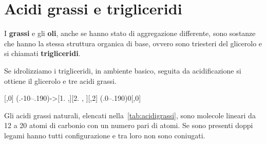 \section{Acidi grassi e trigliceridi}\label{sec:trigliceridi}
I \textbf{grassi} e gli \textbf{oli}, anche se hanno stato di aggregazione differente, sono sostanze che hanno la stessa struttura organica di base, ovvero sono triesteri del glicerolo e si chiamati \textbf{trigliceridi}.

Se idrolizziamo i trigliceridi, in ambiente basico, seguita da acidificazione si ottiene il glicerolo e tre acidi grassi.
\begin{reaction}
	[,0]
	\arrow(.-10--.190){->[1. ,][2. , ]}[,2]
	\arrow(.0--.190){0}[,0] 
\end{reaction}

Gli acidi grassi naturali, elencati nella~\autoref{tab:acidigrassi}, sono molecole lineari da 12 a 20 atomi di carbonio con un numero pari di atomi. Se sono presenti doppi legami hanno tutti configurazione \cis\;e tra loro non sono coniugati.

